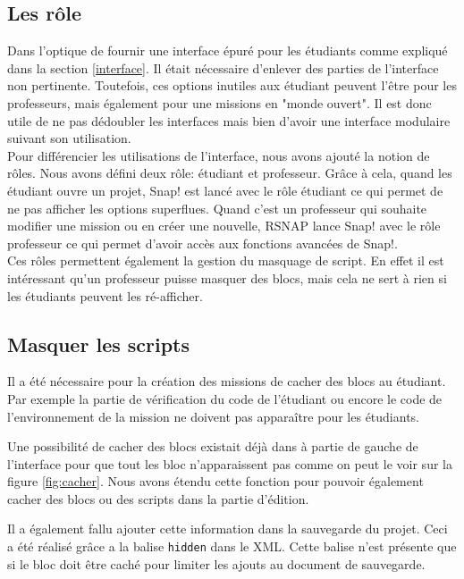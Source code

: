\subsection{Les rôle}
\label{role}
Dans l'optique de fournir une interface épuré pour les étudiants comme expliqué dans la section \ref{interface}. Il était nécessaire d'enlever des parties de l'interface non pertinente. Toutefois, ces options inutiles aux étudiant peuvent l'être pour les professeurs, mais également pour une missions en "monde ouvert". Il est donc utile de ne pas dédoubler les interfaces mais bien d'avoir une interface modulaire suivant son utilisation. \\

Pour différencier les utilisations de l'interface, nous avons ajouté la notion de rôles. Nous avons défini deux rôle: étudiant et professeur. Grâce à cela, quand les étudiant ouvre un projet, Snap! est lancé avec le rôle étudiant ce qui permet de ne pas afficher les options superflues. Quand c'est un professeur qui souhaite modifier une mission ou en créer une nouvelle, RSNAP lance Snap! avec le rôle professeur ce qui permet d'avoir accès aux fonctions avancées de Snap!.\\

Ces rôles permettent également la gestion du masquage de script. En effet il est intéressant qu'un professeur puisse masquer des blocs, mais cela ne sert à rien si les étudiants peuvent les ré-afficher.

\subsection{Masquer les scripts}
Il a été nécessaire pour la création des missions de cacher des blocs au étudiant. Par exemple la partie de vérification du code de l'étudiant ou encore le code de l'environnement de la mission ne doivent pas apparaître pour les étudiants. 

Une possibilité de cacher des blocs existait déjà dans à partie de gauche de l'interface pour que tout les bloc n'apparaissent pas comme on peut le voir sur la figure \ref{fig:cacher}. Nous avons étendu cette fonction pour pouvoir également cacher des blocs ou des scripts dans la partie d'édition.

Il a également fallu ajouter cette information dans la sauvegarde du projet. Ceci a été réalisé grâce a la balise \texttt{hidden} dans le XML. Cette balise n'est présente que si le bloc doit être caché pour limiter les ajouts au document de sauvegarde.\\


